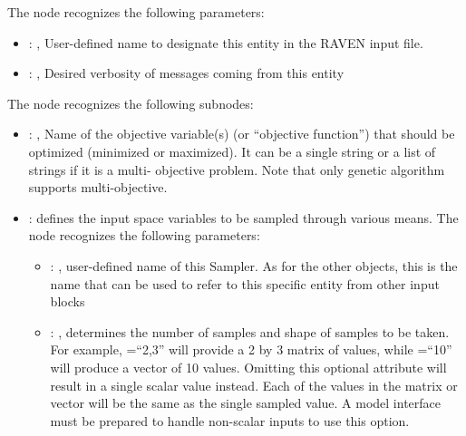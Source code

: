   The  node recognizes the following parameters:
    \begin{itemize}
      \item {}: ,
        User-defined name to designate this entity in the RAVEN input file.
      \item {}: ,
        Desired verbosity of messages coming from this entity
  \end{itemize}

  The  node recognizes the following subnodes:
  \begin{itemize}
    \item {}: ,
      Name of the objective variable(s) (or ``objective function'') that should be optimized
      (minimized or maximized). It can be a single string or a list of strings if it is a multi-
      objective problem.         Note that only genetic algorithm supports multi-objective.

    \item {}:
      defines the input space variables to be sampled through various means.
      The  node recognizes the following parameters:
        \begin{itemize}
          \item {}: ,
            user-defined name of this Sampler. \nb As for the other objects,               this is
            the name that can be used to refer to this specific entity from other input blocks
          \item {}: ,
            determines the number of samples and shape of samples               to be taken.  For
            example, =``2,3'' will provide a 2 by 3               matrix of values,
            while =``10'' will produce a vector of 10 values.               Omitting
            this optional attribute will result in a single scalar value instead.               Each
            of the values in the matrix or vector will be the same as the single sampled value.
            \nb A model interface must be prepared to handle non-scalar inputs to use this option.
      \end{itemize}


\end{itemize}
